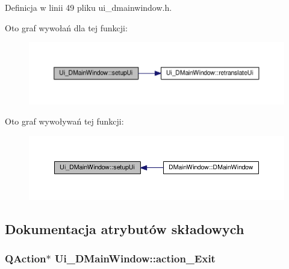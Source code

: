 Definicja w linii 49 pliku ui\-\_\-dmainwindow.\-h.



Oto graf wywołań dla tej funkcji\-:
\nopagebreak
\begin{figure}[H]
\begin{center}
\leavevmode
\includegraphics[width=350pt]{class_ui___d_main_window_aa53f3a89bf520704a3e79037df2fd451_cgraph}
\end{center}
\end{figure}




Oto graf wywoływań tej funkcji\-:
\nopagebreak
\begin{figure}[H]
\begin{center}
\leavevmode
\includegraphics[width=350pt]{class_ui___d_main_window_aa53f3a89bf520704a3e79037df2fd451_icgraph}
\end{center}
\end{figure}




\subsection{Dokumentacja atrybutów składowych}
\hypertarget{class_ui___d_main_window_a00e6b795743b676bdf3ed853e91f7029}{
\subsubsection[{action\-\_\-\-Exit}]{\setlength{\rightskip}{0pt plus 5cm}Q\-Action$\ast$ Ui\-\_\-\-D\-Main\-Window\-::action\-\_\-\-Exit}}\label{class_ui___d_main_window_a00e6b795743b676bdf3ed853e91f7029}


